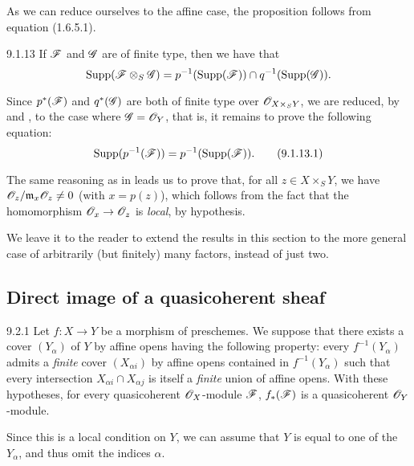 \documentclass[10pt,oneside]{book}
\begin{document}
As we can reduce ourselves to the affine case, the proposition follows from
equation (1.6.5.1).

\begin{envs}[Corollary]{9.1.13}
\label{cor-1.9.1.13}
If $\mathscr{F}$ and $\mathscr{G}$ are of finite type, then we have that
\[
  {\mathop{\mathrm{Supp}}\nolimits}(\mathscr{F}\otimes_S\mathscr{G})=p^{-1}({\mathop{\mathrm{Supp}}\nolimits}(\mathscr{F}))\cap q^{-1}({\mathop{\mathrm{Supp}}\nolimits}(\mathscr{G})).
\]
\end{envs}

Since $p^*(\mathscr{F})$ and $q^*(\mathscr{G})$ are both of finite type over
$\mathscr{O}_{X\times_S Y}$, we are reduced, by  and , to
the case where $\mathscr{G}=\mathscr{O}_Y$, that is, it remains to prove the following
equation:
\[
  {\mathop{\mathrm{Supp}}\nolimits}(p^{-1}(\mathscr{F}))=p^{-1}({\mathop{\mathrm{Supp}}\nolimits}(\mathscr{F})).\tag{9.1.13.1}
\]

The same reasoning as in  leads us to prove that, for all
$z\in X\times_S Y$, we have $\mathscr{O}_z/\mathfrak{m}_x\mathscr{O}_z\neq0$ (with $x=p(z)$),
which follows from the fact that the homomorphism $\mathscr{O}_x\to\mathscr{O}_z$ is \emph{local},
by hypothesis.

We leave it to the reader to extend the results in this section to the more
general case of arbitrarily (but finitely) many factors, instead of just two.

\subsection{Direct image of a quasicoherent sheaf}
\label{1-schemes-9.2}

\begin{envs}[Proposition]{9.2.1}
\label{prop-1.9.2.1}
Let $f:X\to Y$ be a morphism of
preschemes. We suppose that there exists a cover $(Y_\alpha)$ of $Y$ by affine
opens having the following property: every $f^{-1}(Y_\alpha)$ admits a
\emph{finite} cover $(X_{\alpha i})$ by affine opens contained in
$f^{-1}(Y_\alpha)$ such that every intersection $X_{\alpha i}\cap X_{\alpha j}$
is itself a \emph{finite} union of affine opens. With these hypotheses, for
every quasicoherent $\mathscr{O}_X$-module $\mathscr{F}$, $f_*(\mathscr{F})$ is a
quasicoherent $\mathscr{O}_Y$-module.
\end{envs}

Since this is a local condition on $Y$, we can assume that $Y$ is equal to one
of the $Y_\alpha$, and thus omit the indices $\alpha$.
\end{document}
